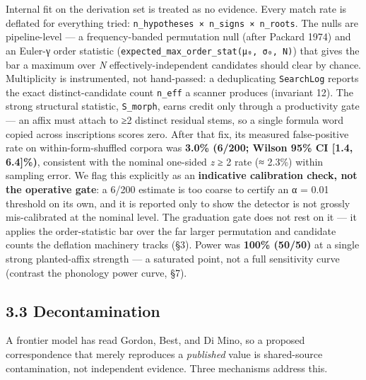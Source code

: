 \documentclass[
  10pt,
]{article}
\begin{document}
Internal fit on the derivation set is treated as no evidence. Every
match rate is deflated for everything tried:
\texttt{n\_hypotheses\ ×\ n\_signs\ ×\ n\_roots}. The nulls are
pipeline-level --- a frequency-banded permutation null (after Packard
1974) and an Euler-γ order statistic
(\texttt{expected\_max\_order\_stat(μ₀,\ σ₀,\ N)}) that gives the bar a
maximum over \emph{N} effectively-independent candidates should clear by
chance. Multiplicity is instrumented, not hand-passed: a deduplicating
\texttt{SearchLog} reports the exact distinct-candidate count
\texttt{n\_eff} a scanner produces (invariant 12). The strong structural
statistic, \texttt{S\_morph}, earns credit only through a productivity
gate --- an affix must attach to ≥2 distinct residual stems, so a single
formula word copied across inscriptions scores zero. After that fix, its
measured false-positive rate on within-form-shuffled corpora was
\textbf{3.0\% (6/200; Wilson 95\% CI {[}1.4, 6.4{]}\%)}, consistent with
the nominal one-sided \emph{z} ≥ 2 rate (≈ 2.3\%) within sampling error.
We flag this explicitly as an \textbf{indicative calibration check, not
the operative gate}: a 6/200 estimate is too coarse to certify an α =
0.01 threshold on its own, and it is reported only to show the detector
is not grossly mis-calibrated at the nominal level. The graduation gate
does not rest on it --- it applies the order-statistic bar over the far
larger permutation and candidate counts the deflation machinery tracks
(§3). Power was \textbf{100\% (50/50)} at a single strong planted-affix
strength --- a saturated point, not a full sensitivity curve (contrast
the phonology power curve, §7).

\hypertarget{decontamination}{%
\subsection{3.3 Decontamination}\label{decontamination}}

A frontier model has read Gordon, Best, and Di Mino, so a proposed
correspondence that merely reproduces a \emph{published} value is
shared-source contamination, not independent evidence. Three mechanisms
address this.
\end{document}
